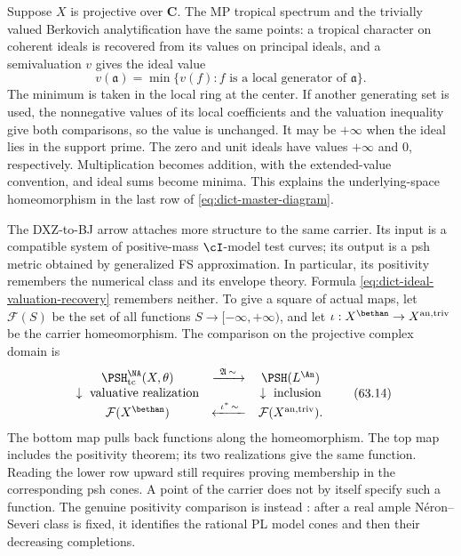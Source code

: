 Suppose $X$ is projective over $\mathbf C$.  The MP tropical spectrum
and the trivially valued Berkovich analytification have the same points:
a tropical character on coherent ideals is recovered from its values on
principal ideals, and a semivaluation $v$ gives the ideal value
\[
                    v(\mathfrak a)
       =\min\{v(f):f\text{ is a local generator of }\mathfrak a\}.
\tag{63.13}\label{eq:dict-ideal-valuation-recovery}
\]
The minimum is taken in the local ring at the center. If another generating
set is used, the nonnegative values of its local coefficients and the
valuation inequality give both comparisons, so the value is unchanged.
It may be $+\infty$ when the ideal lies in the support prime.
The zero and unit ideals have values $+\infty$ and $0$, respectively.
Multiplication becomes addition, with the extended-value convention,
and ideal sums become minima.  This explains the
underlying-space homeomorphism in the last row of
\eqref{eq:dict-master-diagram}.

The DXZ-to-BJ arrow attaches more structure to the same carrier.  Its input
is a compatible system of positive-mass $\cI$-model test curves; its
output is a psh metric obtained by generalized FS approximation.  In
particular, its positivity remembers the numerical class and its envelope
theory.  Formula \eqref{eq:dict-ideal-valuation-recovery} remembers neither.
To give a square of actual maps, let
$\mathcal F(S)$ be the set of all functions $S\to[-\infty,+\infty)$,
and let $\iota:X^\bethan\to X^{\mathrm{an,triv}}$ be the carrier
homeomorphism. The comparison on the projective complex domain is
\[
\begin{array}{ccc}
\PSH^{\NA}_{\mathrm{tc}}(X,\theta)&
 \xrightarrow{\ \mathfrak A\,\sim\ }&\PSH(L^{\An})\\
\downarrow\text{ valuative realization}&&\downarrow\text{ inclusion}\\
\mathcal F(X^\bethan)&
 \xleftarrow{\ \iota^*\,\sim\ }&\mathcal F(X^{\mathrm{an,triv}}).
\end{array}
\tag{63.14}\label{eq:dict-dxz-mp-forgetful-square}
\]
The bottom map pulls back functions along the homeomorphism. The top map
includes the positivity theorem; its two realizations give the same
function. Reading the lower row upward still requires proving membership
in the corresponding psh cones. A point of the carrier does not by itself
specify such a function.  The genuine positivity comparison is instead
: after a real ample
N\'eron--Severi class is fixed, it identifies the rational PL model cones
and then their decreasing completions.

